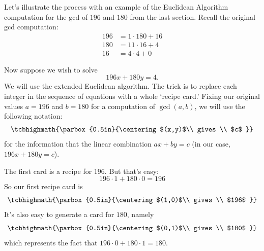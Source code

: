 \documentclass{article}
\theoremstyle{plain}
\theoremstyle{definition}
\theoremstyle{remark}
\numberwithin{theorem}{section}
\begin{document}
Let’s illustrate the process with an example of the Euclidean Algorithm computation for the gcd of $196$ and $180$ from the last section.  
Recall the original gcd computation:
\begin{align*}
	196 &= 1 \cdot 180 + 16 \\
	180 &= 11 \cdot 16 + 4 \\
	16 &= 4 \cdot 4 + 0
\end{align*}

\newcommand{\card}[1]{\tcbhighmath{\parbox{0.5in}{\centering #1 }}}
Now suppose we wish to solve
\[
	196x + 180 y = 4.
\]
We will use the extended Euclidean algorithm.  The trick is to replace each integer in the sequence of equations with a whole `recipe card.'
Fixing our original values $a=196$ and $b=180$ for a computation of $\gcd(a,b)$, we will use the following notation:
\[
  \card{ $(x,y)$\\ gives \\ $c$ }
\]
for the information that the linear combination $ax + by = c$ (in our case, $196x + 180y = c$).

The first card is a recipe for $196$.  But that's easy:
\[
	196 \cdot 1 + 180 \cdot 0 = 196
\]
So our first recipe card is
\[
  \card{ $(1,0)$\\ gives \\ $196$ }
\]
It's also easy to generate a card for $180$, namely
\[
  \card{ $(0,1)$\\ gives \\ $180$ }
\]
which represents the fact that $196 \cdot 0 + 180 \cdot 1 = 180$.
\end{document}
